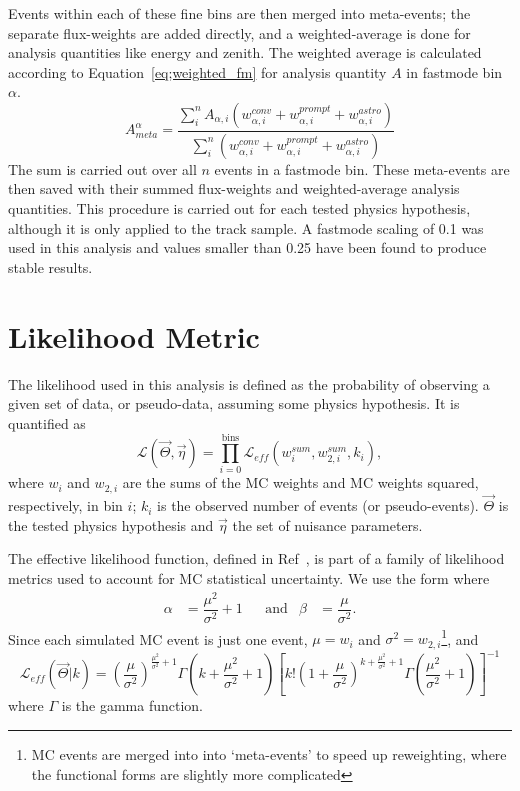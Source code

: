 \documentclass[main.tex]{subfiles}
\begin{document}
Events within each of these fine bins are then merged into meta-events; the separate flux-weights are added directly, and a weighted-average is done for analysis quantities like energy and zenith.
The weighted average is calculated according to Equation~\eqref{eq;weighted_fm} for analysis quantity $A$ in fastmode bin $\alpha$.
\begin{equation}\label{eq;weighted_fm}
A_{meta}^{\alpha} = \dfrac{\sum_{i}^{n} A_{\alpha, i} \left(w_{\alpha, i}^{conv} + w_{\alpha,i}^{prompt} + w_{\alpha,i}^{astro}\right) }{\sum_{i}^{n} \left(w_{\alpha, i}^{conv} + w_{\alpha,i}^{prompt} + w_{\alpha,i}^{astro}\right)}
\end{equation}
The sum is carried out over all $n$ events in a fastmode bin. 
These meta-events are then saved with their summed flux-weights and weighted-average analysis quantities.
This procedure is carried out for each tested physics hypothesis, although it is only applied to the track sample. 
A fastmode scaling of 0.1 was used in this analysis and values smaller than 0.25 have been found to produce stable results. 


\section{Likelihood Metric}\label{sect:llh_metric}

The likelihood used in this analysis is defined as the probability of observing a given set of data, or pseudo-data, assuming some physics hypothesis.
It is quantified as 
\begin{equation}
    \mathcal{L}(\vec{\Theta}, \vec{\eta}) = \prod_{i=0}^{\text{bins}} \mathcal{L}_{eff}\left( w_{i}^{sum}, w_{2,i}^{sum}, k_{i} \right),
\end{equation}
where $w_{i}$ and $w_{2,i}$ are the sums of the MC weights and MC weights squared, respectively, in bin $i$; $k_{i}$ is the observed number of events (or pseudo-events). 
$\vec{\Theta}$ is the tested physics hypothesis and $\vec{\eta}$ the set of nuisance parameters. 

The effective likelihood function, defined in Ref~\cite{effective_llh}, is part of a family of likelihood metrics used to account for MC statistical uncertainty. 
We use the form where
\begin{align}
    \alpha&=\dfrac{\mu^{2}}{\sigma^{2}} +1 & &\text{and} & \beta&=\dfrac{\mu}{\sigma^{2}}.
\end{align}
Since each simulated MC event is just one event, $\mu = w_{i}$ and $\sigma^{2} = w_{2,i}$\footnote{MC events are merged into into `meta-events' to speed up reweighting, where the functional forms are slightly more complicated}, and
\begin{equation}
    \mathcal{L}_{eff}(\vec{\Theta} | k) = \left(\dfrac{\mu}{\sigma^{2}}\right)^{\tfrac{\mu^{2}}{\sigma^{2}} + 1} \Gamma\left(k + \dfrac{\mu^{2}}{\sigma^{2}} + 1\right) \left[ k! \left(1+\dfrac{\mu}{\sigma^{2}}\right)^{k+\tfrac{\mu^{2}}{\sigma^{2}} + 1} \Gamma\left(\dfrac{\mu^{2}}{\sigma^{2}} +1\right)\right]^{-1}
\end{equation}
where $\Gamma$ is the gamma function. 
\end{document}
